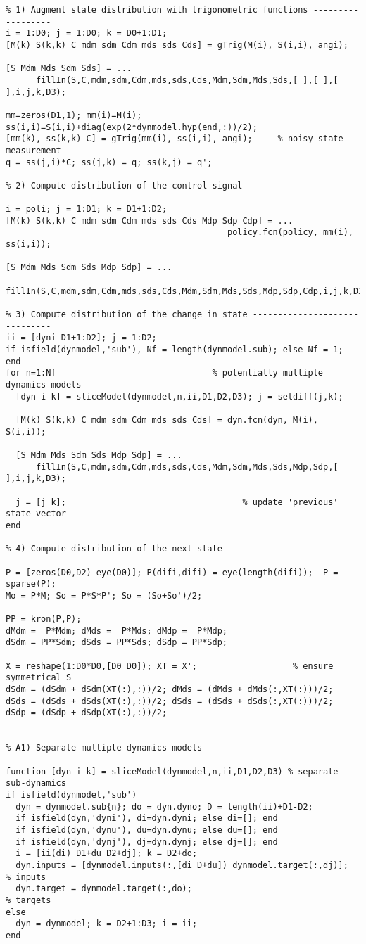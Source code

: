 \begin{lstlisting}
% 1) Augment state distribution with trigonometric functions ------------------
i = 1:D0; j = 1:D0; k = D0+1:D1;
[M(k) S(k,k) C mdm sdm Cdm mds sds Cds] = gTrig(M(i), S(i,i), angi);

[S Mdm Mds Sdm Sds] = ...
      fillIn(S,C,mdm,sdm,Cdm,mds,sds,Cds,Mdm,Sdm,Mds,Sds,[ ],[ ],[ ],i,j,k,D3);

mm=zeros(D1,1); mm(i)=M(i); ss(i,i)=S(i,i)+diag(exp(2*dynmodel.hyp(end,:))/2);
[mm(k), ss(k,k) C] = gTrig(mm(i), ss(i,i), angi);     % noisy state measurement
q = ss(j,i)*C; ss(j,k) = q; ss(k,j) = q';

% 2) Compute distribution of the control signal -------------------------------
i = poli; j = 1:D1; k = D1+1:D2;
[M(k) S(k,k) C mdm sdm Cdm mds sds Cds Mdp Sdp Cdp] = ...
                                            policy.fcn(policy, mm(i), ss(i,i));

[S Mdm Mds Sdm Sds Mdp Sdp] = ...
      fillIn(S,C,mdm,sdm,Cdm,mds,sds,Cds,Mdm,Sdm,Mds,Sds,Mdp,Sdp,Cdp,i,j,k,D3);

% 3) Compute distribution of the change in state ------------------------------
ii = [dyni D1+1:D2]; j = 1:D2;
if isfield(dynmodel,'sub'), Nf = length(dynmodel.sub); else Nf = 1; end
for n=1:Nf                               % potentially multiple dynamics models
  [dyn i k] = sliceModel(dynmodel,n,ii,D1,D2,D3); j = setdiff(j,k);
  
  [M(k) S(k,k) C mdm sdm Cdm mds sds Cds] = dyn.fcn(dyn, M(i), S(i,i));
  
  [S Mdm Mds Sdm Sds Mdp Sdp] = ...
      fillIn(S,C,mdm,sdm,Cdm,mds,sds,Cds,Mdm,Sdm,Mds,Sds,Mdp,Sdp,[ ],i,j,k,D3);
  
  j = [j k];                                   % update 'previous' state vector
end

% 4) Compute distribution of the next state -----------------------------------
P = [zeros(D0,D2) eye(D0)]; P(difi,difi) = eye(length(difi));  P = sparse(P);
Mo = P*M; So = P*S*P'; So = (So+So')/2;

PP = kron(P,P);
dMdm =  P*Mdm; dMds =  P*Mds; dMdp =  P*Mdp;
dSdm = PP*Sdm; dSds = PP*Sds; dSdp = PP*Sdp;

X = reshape(1:D0*D0,[D0 D0]); XT = X';                   % ensure symmetrical S
dSdm = (dSdm + dSdm(XT(:),:))/2; dMds = (dMds + dMds(:,XT(:)))/2;
dSds = (dSds + dSds(XT(:),:))/2; dSds = (dSds + dSds(:,XT(:)))/2;
dSdp = (dSdp + dSdp(XT(:),:))/2;


% A1) Separate multiple dynamics models ---------------------------------------
function [dyn i k] = sliceModel(dynmodel,n,ii,D1,D2,D3) % separate sub-dynamics
if isfield(dynmodel,'sub')
  dyn = dynmodel.sub{n}; do = dyn.dyno; D = length(ii)+D1-D2;
  if isfield(dyn,'dyni'), di=dyn.dyni; else di=[]; end
  if isfield(dyn,'dynu'), du=dyn.dynu; else du=[]; end
  if isfield(dyn,'dynj'), dj=dyn.dynj; else dj=[]; end
  i = [ii(di) D1+du D2+dj]; k = D2+do;
  dyn.inputs = [dynmodel.inputs(:,[di D+du]) dynmodel.target(:,dj)];   % inputs
  dyn.target = dynmodel.target(:,do);                                 % targets
else
  dyn = dynmodel; k = D2+1:D3; i = ii;
end


\end{lstlisting}
